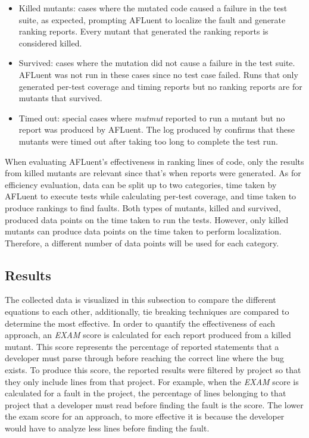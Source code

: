 \begin{itemize}
    \item Killed mutants: cases where the mutated code caused a failure in the
    test suite, as expected, prompting AFLuent to localize the fault and
    generate ranking reports.
    Every mutant that generated the ranking reports is
    considered killed.
    \item Survived: cases where the mutation did not cause a failure in the test
    suite. AFLuent was not run in these cases since no test case failed. Runs
    that only generated per-test coverage and timing reports but no ranking reports
    are for mutants that survived.
    \item Timed out: special cases where \emph{mutmut} reported to run a mutant
    but no report was produced by AFLuent. The log produced by 
    confirms that these mutants were timed out after taking too long to complete
    the test run.
\end{itemize}

When evaluating AFLuent's effectiveness in ranking lines of code, only the
results from killed mutants are relevant since that's when reports were
generated. As for efficiency evaluation, data can be split up to two categories,
time taken by AFLuent to execute tests while calculating per-test coverage, and
time taken to produce rankings to find faults. Both types of mutants, killed and
survived, produced data points on the time taken to run the tests. However, only
killed mutants can produce data points on the time taken to perform
localization. Therefore, a different number of data points will be used for each
category.

\subsection{Results}
\label{subsec:eval_results}

The collected data is visualized in this subsection to compare the different
equations to each other, additionally, tie breaking techniques are compared to
determine the most effective. In order to quantify the effectiveness of each
approach, an \emph{EXAM} \cite{exam_scores}
score is calculated for each report produced from a killed mutant. This score
represents the percentage of reported statements that a developer must parse
through before reaching the correct line where the bug exists. To produce this
score, the reported results were filtered by project so that they
only include lines from that project. For example, when the \emph{EXAM}
score is calculated for a fault in the  project, the
percentage of lines belonging to that project that a developer must read before
finding the fault is the score. The lower the exam score for an approach, to
more effective it is because the developer would have to analyze less lines
before finding the fault.

